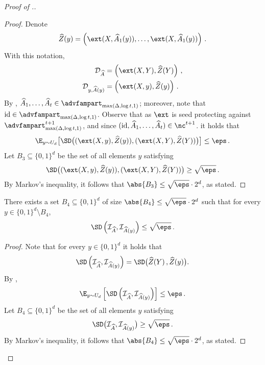 \begin{proof}[Proof of .]
\begin{proof}
	Denote 
	\begin{align*}
		\widehat{Z}(y) = \left(\ext(X,\widehat{A}_1(y)), \ldots, \ext(X,\widehat{A}_1(y))\right)\,.
	\end{align*}
	With this notation, 
	\begin{align*}
	\mathcal{D}_{\widehat{A}} &= \left( \ext(X,Y), \widehat{Z}(Y) \right)\,, \\
	\mathcal{D}_{y,\widehat{A}(y)} &= \left( \ext(X,y), \widehat{Z}(y) \right)\,.
	\end{align*}
%
	By , $\widehat{A}_1,\ldots,\widehat{A}_t \in \advfampart_{\max(\Delta, \log t,1)}$; moreover, note that  $\mathrm{id} \in \advfampart_{\max(\Delta, \log t,1)}$. Observe that as $\ext$ is seed protecting against $\advfampart_{\max(\Delta, \log t,1)}^{t+1}$, and since $(\mathrm{id},\widehat{A}_1,\ldots,\widehat{A}_t) \in \nc^{t+1}$. it holds that %
	\begin{equation}\label{eq: low z}
	\E_{y\sim U_d}\big[\SD\big((\ext(X,y), \widehat{Z}(y)), (\ext(X,Y),\widehat{Z}(Y))\big)\big] \leq \eps\,.
	\end{equation}
	Let $B_3 \subseteq \{0,1\}^d$ be the set of all elements $y$ satisfying
	\begin{align*}
	\SD\big((\ext(X,y), \widehat{Z}(y)),(\ext(X,Y), \widehat{Z}(Y))\big) \geq \sqrt{\eps}\,.
	\end{align*}
	By Markov's inequality, it follows that $\abs{B_3} \leq \sqrt{\eps}\cdot 2^d$, as stated.
%
	
\end{proof}

\begin{claim}\label{claim:i is concentrated}
	There exists a set
	 $B_4 \subseteq \{0,1\}^d$ of size $\abs{B_4} \le \sqrt{\eps} \cdot 2^d$ such that for every $y \in \{0,1\}^d \setminus B_4$,
	\[
	\SD\left(\mathcal{I}_{\widehat{A}}, \mathcal{I}_{\widehat{A}(y)}\right) \le \sqrt{\eps}\,.
	\]
\end{claim}
\begin{proof}
	Note that for every $y \in \{0,1\}^d$ it holds that  
	\[
	\SD\left(\mathcal{I}_{\widehat{A}}, \mathcal{I}_{\widehat{A}(y)}\right) = \SD\big(\widehat{Z}(Y)\,, \widehat{Z}(y)\big).
	\]
	By ,
	\[
	\E_{y\sim U_d}\left[\SD\left(\mathcal{I}_{\widehat{A}}, \mathcal{I}_{\widehat{A}(y)}\right)\right] \leq \eps\,.  
	\]
	Let $B_4 \subseteq \{0,1\}^d$ be the set of all elements $y$ satisfying
	\begin{align*}
	\SD\big(\mathcal{I}_{\widehat{A}}, \mathcal{I}_{\widehat{A}(y)}\big) \geq \sqrt{\eps}\,.
	\end{align*}
	By Markov's inequality, it follows that $\abs{B_4} \leq \sqrt{\eps}\cdot 2^d$, as stated.
\end{proof}



\end{proof}
